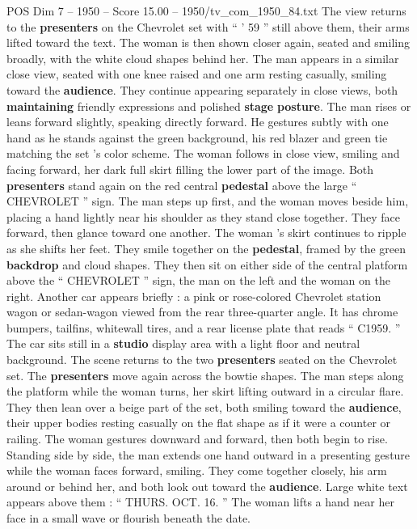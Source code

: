 \begin{textsample}{POS Dim 7 – 1950 – Score 15.00 – 1950/tv\_com\_1950\_84.txt}
The view returns to the \textbf{presenters} on the Chevrolet set with “ ’ 59 ” still above them, their arms lifted toward the text.
The woman is then shown closer again, seated and smiling broadly, with the white cloud shapes behind her.
The man appears in a similar close view, seated with one knee raised and one arm resting casually, smiling toward the \textbf{audience}.
They continue appearing separately in close views, both \textbf{maintaining} friendly expressions and polished \textbf{stage} \textbf{posture}.
The man rises or leans forward slightly, speaking directly forward.
He gestures subtly with one hand as he stands against the green background, his red blazer and green tie matching the set ’s color scheme.
The woman follows in close view, smiling and facing forward, her dark full skirt filling the lower part of the image.
Both \textbf{presenters} stand again on the red central \textbf{pedestal} above the large “ CHEVROLET ” sign.
The man steps up first, and the woman moves beside him, placing a hand lightly near his shoulder as they stand close together.
They face forward, then glance toward one another.
The woman ’s skirt continues to ripple as she shifts her feet.
They smile together on the \textbf{pedestal}, framed by the green \textbf{backdrop} and cloud shapes.
They then sit on either side of the central platform above the “ CHEVROLET ” sign, the man on the left and the woman on the right.
Another car appears briefly : a pink or rose-colored Chevrolet station wagon or sedan-wagon viewed from the rear three-quarter angle.
It has chrome bumpers, tailfins, whitewall tires, and a rear license plate that reads “ C1959. ” The car sits still in a \textbf{studio} display area with a light floor and neutral background.
The scene returns to the two \textbf{presenters} seated on the Chevrolet set.
The \textbf{presenters} move again across the bowtie shapes.
The man steps along the platform while the woman turns, her skirt lifting outward in a circular flare.
They then lean over a beige part of the set, both smiling toward the \textbf{audience}, their upper bodies resting casually on the flat shape as if it were a counter or railing.
The woman gestures downward and forward, then both begin to rise.
Standing side by side, the man extends one hand outward in a presenting gesture while the woman faces forward, smiling.
They come together closely, his arm around or behind her, and both look out toward the \textbf{audience}.
Large white text appears above them : “ THURS.
OCT. 16. ” The woman lifts a hand near her face in a small wave or flourish beneath the date.

\end{textsample}
